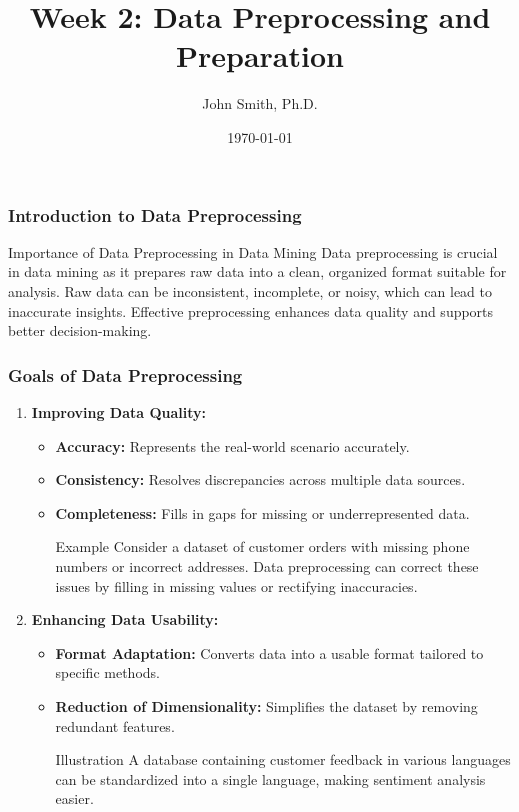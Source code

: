 \documentclass[aspectratio=169]{beamer}
\title[Week 2: Data Preprocessing and Preparation]{Week 2: Data Preprocessing and Preparation}
\author[J. Smith]{John Smith, Ph.D.}
\institute[University Name]{
  Department of Computer Science\\
  University Name\\
  \vspace{0.3cm}
  Email: email@university.edu\\
  Website: www.university.edu
}
\date{\today}
\begin{document}
\frame{\titlepage}

\begin{frame}[fragile]
    \titlepage
\end{frame}

\begin{frame}[fragile]
    \frametitle{Introduction to Data Preprocessing}
    \begin{block}{Importance of Data Preprocessing in Data Mining}
        Data preprocessing is crucial in data mining as it prepares raw data into a clean, organized format suitable for analysis. 
        Raw data can be inconsistent, incomplete, or noisy, which can lead to inaccurate insights. 
        Effective preprocessing enhances data quality and supports better decision-making.
    \end{block}
\end{frame}

\begin{frame}[fragile]
    \frametitle{Goals of Data Preprocessing}
    \begin{enumerate}
        \item \textbf{Improving Data Quality:}
        \begin{itemize}
            \item \textbf{Accuracy:} Represents the real-world scenario accurately.
            \item \textbf{Consistency:} Resolves discrepancies across multiple data sources.
            \item \textbf{Completeness:} Fills in gaps for missing or underrepresented data.

            \begin{block}{Example}
                Consider a dataset of customer orders with missing phone numbers or incorrect addresses. 
                Data preprocessing can correct these issues by filling in missing values or rectifying inaccuracies.
            \end{block}
        \end{itemize}

        \item \textbf{Enhancing Data Usability:}
        \begin{itemize}
            \item \textbf{Format Adaptation:} Converts data into a usable format tailored to specific methods.
            \item \textbf{Reduction of Dimensionality:} Simplifies the dataset by removing redundant features.
            
            \begin{block}{Illustration}
                A database containing customer feedback in various languages can be standardized into a single language, making sentiment analysis easier.
            \end{block}
        \end{itemize}
    \end{enumerate}
\end{frame}
\end{document}
